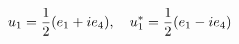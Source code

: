 \begin{equation}
u_{1}={1 \over 2}(e_{1}+ie_{4}),\quad u_{1}^{*}={1 \over 2}(e_{1}-ie_{4})
\end{equation}

